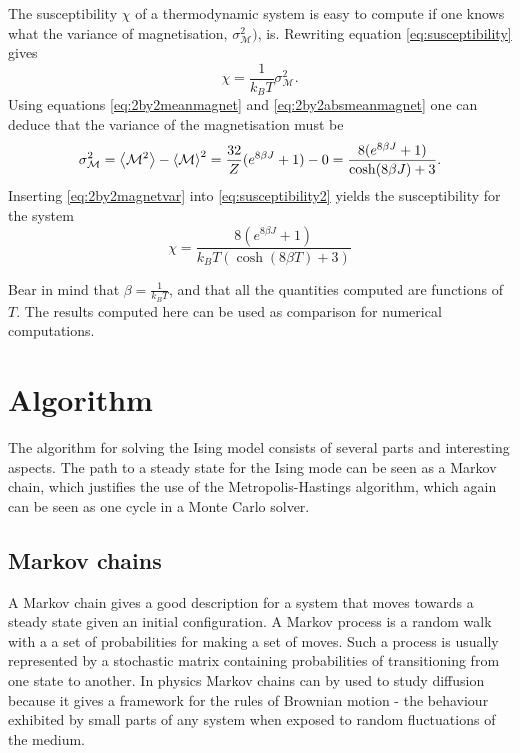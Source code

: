\documentclass[10pt,a4paper]{amsart}
\begin{document}
The susceptibility $\chi$ of a thermodynamic system is easy to compute if one knows what the variance of magnetisation, $\sigma_{\mathcal{M}}^2)$, is. Rewriting equation \ref{eq:susceptibility} gives
\begin{equation}
\label{eq:susceptibility2}
\chi = \frac{1}{k_BT}\sigma_{\mathcal{M}}^2.
\end{equation}
Using equations \ref{eq:2by2meanmagnet} and \ref{eq:2by2absmeanmagnet} one can deduce that the variance of the magnetisation must be
\begin{equation}
\label{eq:2by2magnetvar}
\sigma_{\mathcal{M}}^2 = \ev{\mathcal{M}^2} - \ev{\mathcal{M}}^2 = \frac{32}{Z}(e^{8\beta J} +1) - 0 = \frac{8(e^{8\beta J} + 1)}{\cosh(8\beta J) + 3}.
\end{equation}
Inserting \ref{eq:2by2magnetvar} into \ref{eq:susceptibility2} yields the susceptibility for the system
\begin{equation}
\label{eq:2by2susceptibility}
\chi = \frac{8(e^{8\beta J}+1)}{k_BT(\cosh(8\beta T) + 3)}
\end{equation}

Bear in mind that $\beta = \frac{1}{k_BT}$, and that all the quantities computed are functions of $T$. The results computed here can be used as comparison for numerical computations.

\section{Algorithm}
The algorithm for solving the Ising model consists of several parts and interesting aspects. The path to a steady state for the Ising mode can be seen as a Markov chain, which justifies the use of the Metropolis-Hastings algorithm, which again can be seen as one cycle in a Monte Carlo solver.

\subsection{Markov chains}
A Markov chain gives a good description for a system that moves towards a steady state given an initial configuration. A Markov process is a random walk with a a set of probabilities for making a set of moves. Such a process is usually represented by a stochastic matrix containing probabilities of transitioning from one state to another. In physics Markov chains can by used to study diffusion because it gives a framework for the rules of Brownian motion - the behaviour exhibited by small parts of any system when exposed to random fluctuations of the medium.
\end{document}
